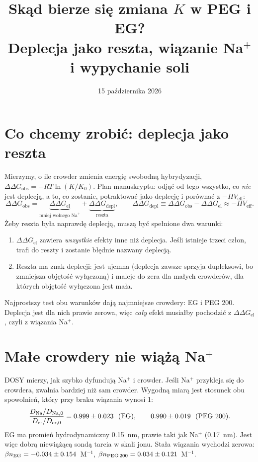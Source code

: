 \documentclass[11pt,a4paper]{article}
\title{Skąd bierze się zmiana $K$ w PEG i EG?\\
\large Deplecja jako reszta, wiązanie Na$^+$ i wypychanie soli}
\date{15 października 2026}
\author{}
\newcommand{\dG}{\Delta\Delta G}
\begin{document}
\maketitle
\vspace{-2em}

\section{Co chcemy zrobić: deplecja jako reszta}

Mierzymy, o ile crowder zmienia energię swobodną hybrydyzacji, $\dG_\text{obs}=-RT\ln(K/K_0)$. Plan manuskryptu: odjąć od tego wszystko, co \emph{nie} jest deplecją, a to, co zostanie, potraktować jako deplecję i porównać z $-\Pi V_\text{eff}$:
\[
\dG_\text{obs}=\underbrace{\dG_\text{el}}_{\text{mniej wolnego Na}^+}+\underbrace{\dG_\text{depl}}_{\text{reszta}},\qquad \dG_\text{depl}\equiv\dG_\text{obs}-\dG_\text{el}\approx-\Pi V_\text{eff}.
\]
Żeby reszta była naprawdę deplecją, muszą być spełnione dwa warunki:
\begin{enumerate}
\item $\dG_\text{el}$ zawiera \emph{wszystkie} efekty inne niż deplecja. Jeśli istnieje trzeci człon, trafi do reszty i zostanie błędnie nazwany deplecją.
\item Reszta ma znak deplecji: jest ujemna (deplecja zawsze sprzyja dupleksowi, bo zmniejsza objętość wyłączoną) i maleje do zera dla małych crowderów, dla których objętość wyłączona jest mała.
\end{enumerate}
Najprostszy test obu warunków dają najmniejsze crowdery: EG i PEG 200. Deplecja jest dla nich prawie zerowa, więc \emph{cały} efekt musiałby pochodzić z $\dG_\text{el}$, czyli z wiązania Na$^+$.

\section{Małe crowdery nie wiążą Na$^+$}

DOSY mierzy, jak szybko dyfundują Na$^+$ i crowder. Jeśli Na$^+$ przykleja się do crowdera, zwalnia bardziej niż sam crowder. Wygodną miarą jest stosunek obu spowolnień, który przy braku wiązania wynosi 1:
\[
\frac{D_\text{Na}/D_\text{Na,0}}{D_\text{cr}/D_\text{cr,0}}=\NratioMeanEG\pm\NratioMeanEGErr\ \ (\text{EG}),\qquad \NratioMeanPEGtwo\pm\NratioMeanPEGtwoErr\ \ (\text{PEG 200}).
\]
EG ma promień hydrodynamiczny 0.15~nm, prawie taki jak Na$^+$ (0.17~nm). Jest więc dobrą niewiążącą sondą tarcia w skali jonu. Stała wiązania wychodzi zerowa: $\beta n_\text{EG}=-0.034\pm0.154$~M$^{-1}$, $\beta n_\text{PEG\,200}=0.034\pm0.121$~M$^{-1}$.
\end{document}

